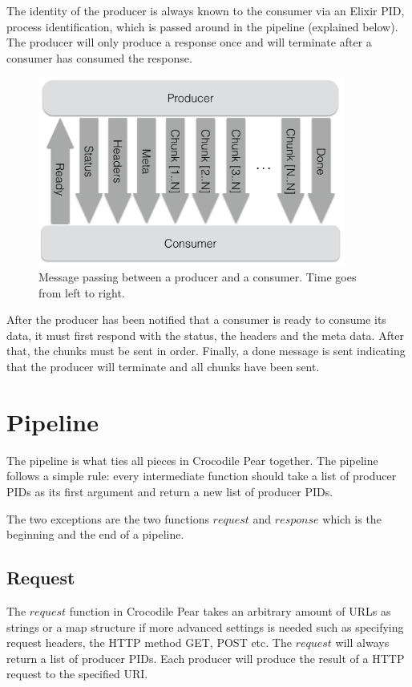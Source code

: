 \documentclass{cslthse-msc}
\begin{document}
The identity of the producer is always known to the consumer via an Elixir PID, process identification, which is passed around in the pipeline (explained below). The producer will only produce a response once and will terminate after a consumer has consumed the response.

\begin{figure}[H]
  \centering
    \begin{center}
      \includegraphics[width=0.9\textwidth]{images/crocpear_producer_consumer.png}
    \end{center}
  \caption{Message passing between a producer and a consumer. Time goes from left to right.}
\end{figure}

After the producer has been notified that a consumer is ready to consume its data, it must first respond with the status, the headers and the meta data. After that, the chunks must be sent in order. Finally, a done message is sent indicating that the producer will terminate and all chunks have been sent.

\section{Pipeline}
The pipeline is what ties all pieces in Crocodile Pear together. The pipeline follows a simple rule: every intermediate function should take a list of producer PIDs as its first argument and return a new list of producer PIDs.

The two exceptions are the two functions $request$ and $response$ which is the beginning and the end of a pipeline.

\subsection{Request}
The $request$ function in Crocodile Pear takes an arbitrary amount of URLs as strings or a map structure if more advanced settings is needed such as specifying request headers, the HTTP method GET, POST etc. The $request$ will always return a list of producer PIDs. Each producer will produce the result of a HTTP request to the specified URI.
\end{document}
